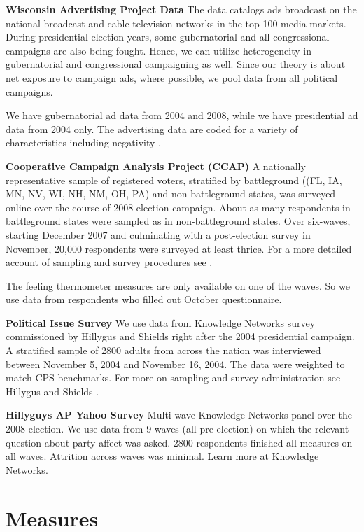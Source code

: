 \documentclass[doc,fignum,noapacite]{apa}
\begin{document}
\textbf{Wisconsin Advertising Project Data}
The data catalogs ads broadcast on the national broadcast and cable television networks in the top 100 media markets. 
During presidential election years, some gubernatorial and all congressional campaigns are also being fought. 
Hence, we can utilize heterogeneity in gubernatorial and congressional campaigning as well. Since our theory is 
about net exposure to campaign ads, where possible, we pool data from all political campaigns.

We have gubernatorial ad data from 2004 and 2008, while we have presidential ad data from 2004 only. The advertising 
data are coded for a variety of characteristics including negativity \cite {Goldstein2007}. 

\textbf{Cooperative Campaign Analysis Project (CCAP)} A nationally representative sample of registered voters, 
stratified by battleground ((FL, IA, MN, NV, WI, NH, NM, OH, PA) and non-battleground states, was surveyed online 
over the course of 2008 election campaign. About as many respondents in battleground states were sampled as in 
non-battleground states. Over six-waves, starting December 2007 and culminating with a post-election survey in 
November, 20,000 respondents were surveyed at least thrice. For a more detailed account of sampling and survey 
procedures see \cite {Jackman2009}. 

The feeling thermometer measures are only available on one of the waves. So we use data from respondents who
filled out October questionnaire.

\textbf{Political Issue Survey} We use data from Knowledge Networks survey commissioned by Hillygus and Shields \cite {Hillygus2008} 
right after the 2004 presidential campaign. A stratified sample of 2800 adults from across the nation was interviewed 
between November 5, 2004 and November 16, 2004. The data were weighted to match CPS benchmarks. For more on sampling 
and survey administration see Hillygus and Shields \cite {Hillygus2008}. 

\textbf{Hillyguys AP Yahoo Survey} Multi-wave Knowledge Networks panel over the 2008 election. We use data from 9 
waves (all pre-election) on which the relevant question about party affect was asked. 2800 respondents finished all 
measures on all waves. Attrition across waves was minimal. Learn more at 
\href{http://www.knowledgenetworks.com/ganp/election2008/files.html}{Knowledge Networks}.

\section{Measures}
\end{document}
